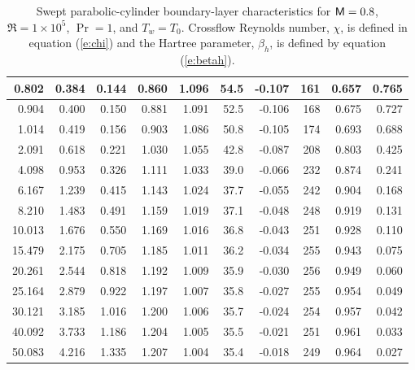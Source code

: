 \begin{table}[p]
\begin{tabular}{|r||r|r|r|r|r|r|r|r|r|}
0.802 & 0.384 & 0.144 & 0.860 & 1.096 & 54.5 & -0.107 & 161 & 0.657 & 0.765\\ \hline
0.904 & 0.400 & 0.150 & 0.881 & 1.091 & 52.5 & -0.106 & 168 & 0.675 & 0.727\\ \hline
1.014 & 0.419 & 0.156 & 0.903 & 1.086 & 50.8 & -0.105 & 174 & 0.693 & 0.688\\ \hline
2.091 & 0.618 & 0.221 & 1.030 & 1.055 & 42.8 & -0.087 & 208 & 0.803 & 0.425\\ \hline
4.098 & 0.953 & 0.326 & 1.111 & 1.033 & 39.0 & -0.066 & 232 & 0.874 & 0.241\\ \hline
6.167 & 1.239 & 0.415 & 1.143 & 1.024 & 37.7 & -0.055 & 242 & 0.904 & 0.168\\ \hline
8.210 & 1.483 & 0.491 & 1.159 & 1.019 & 37.1 & -0.048 & 248 & 0.919 & 0.131\\ \hline
10.013 & 1.676 & 0.550 & 1.169 & 1.016 & 36.8 & -0.043 & 251 & 0.928 & 0.110\\ \hline
15.479 & 2.175 & 0.705 & 1.185 & 1.011 & 36.2 & -0.034 & 255 & 0.943 & 0.075\\ \hline
20.261 & 2.544 & 0.818 & 1.192 & 1.009 & 35.9 & -0.030 & 256 & 0.949 & 0.060\\ \hline
25.164 & 2.879 & 0.922 & 1.197 & 1.007 & 35.8 & -0.027 & 255 & 0.954 & 0.049\\ \hline
30.121 & 3.185 & 1.016 & 1.200 & 1.006 & 35.7 & -0.024 & 254 & 0.957 & 0.042\\ \hline
40.092 & 3.733 & 1.186 & 1.204 & 1.005 & 35.5 & -0.021 & 251 & 0.961 & 0.033\\ \hline
50.083 & 4.216 & 1.335 & 1.207 & 1.004 & 35.4 & -0.018 & 249 & 0.964 & 0.027\\ \hline
\end{tabular}
\caption [Swept parabolic-cylinder boundary-layer characteristics] {Swept
parabolic-cylinder boundary-layer characteristics for ${\sf M}=0.8$,
$\Re=1\times10^{5}$, $\Pr=1$, and $T_w = T_0$.  Crossflow Reynolds number,
$\chi$, is defined in equation (\protect\ref{e:chi}) and the Hartree
parameter, $\beta_h$, is defined by equation
(\protect\ref{e:betah}). \label{t:results}}
\end{table}

